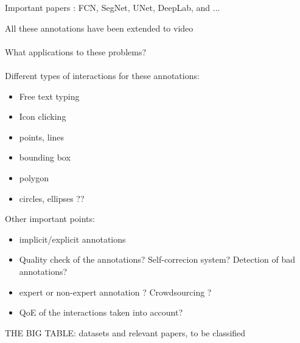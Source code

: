Important papers : FCN, SegNet, UNet, DeepLab, and ... 


All these annotations have been extended to video \\ \\

What applications to these problems? \\ \\


Different types of interactions for these annotations:

\begin{itemize}
	\item Free text typing
	\item Icon clicking
	\item points, lines
	\item bounding box
	\item polygon
	\item circles, ellipses ??
\end{itemize}

Other important points:

\begin{itemize}
	\item implicit/explicit annotations
	\item Quality check of the annotations? Self-correcion system? Detection of bad annotations?
	\item expert or non-expert annotation ? Crowdsourcing ?
	\item QoE of the interactions taken into account?
\end{itemize}

THE BIG TABLE: datasets and relevant papers, to be classified


